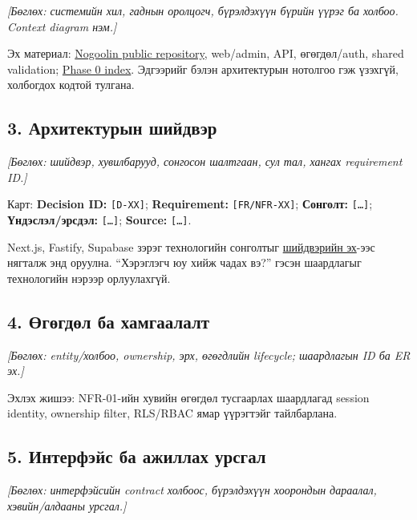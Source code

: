 \documentclass[
  11pt,
  a4paper,
]{article}
\begin{document}
\emph{{[}Бөглөх: системийн хил, гаднын оролцогч, бүрэлдэхүүн бүрийн
үүрэг ба холбоо. Context diagram нэм.{]}}

Эх материал: \href{https://github.com/Tengis01/Nogoolin}{Nogoolin public
repository}, web/admin, API, өгөгдөл/auth, shared validation;
\href{../../phase-0/README.md}{Phase 0 index}. Эдгээрийг бэлэн
архитектурын нотолгоо гэж үзэхгүй, холбогдох кодтой тулгана.

\subsection{3. Архитектурын
шийдвэр}\label{doc6-ux430ux440ux445ux438ux442ux435ux43aux442ux443ux440ux44bux43d-ux448ux438ux439ux434ux432ux44dux440}

\emph{{[}Бөглөх: шийдвэр, хувилбарууд, сонгосон шалтгаан, сул тал,
хангах requirement ID.{]}}

Карт: \textbf{Decision ID:} \nolinkurl{[D-XX]}; \textbf{Requirement:}
\nolinkurl{[FR/NFR-XX]}; \textbf{Сонголт:} \nolinkurl{[…]};
\textbf{Үндэслэл/эрсдэл:} \nolinkurl{[…]}; \textbf{Source:}
\nolinkurl{[…]}.

Next.js, Fastify, Supabase зэрэг технологийн сонголтыг
\href{../../../agent-context/DECISIONS.md}{шийдвэрийн эх}-ээс нягталж
энд оруулна. ``Хэрэглэгч юу хийж чадах вэ?'' гэсэн шаардлагыг
технологийн нэрээр орлуулахгүй.

\subsection{4. Өгөгдөл ба
хамгаалалт}\label{doc6-ux4e9ux433ux4e9ux433ux434ux4e9ux43b-ux431ux430-ux445ux430ux43cux433ux430ux430ux43bux430ux43bux442}

\emph{{[}Бөглөх: entity/холбоо, ownership, эрх, өгөгдлийн lifecycle;
шаардлагын ID ба ER эх.{]}}

Эхлэх жишээ: NFR-01-ийн хувийн өгөгдөл тусгаарлах шаардлагад session
identity, ownership filter, RLS/RBAC ямар үүрэгтэйг тайлбарлана.

\subsection{5. Интерфэйс ба ажиллах
урсгал}\label{doc6-ux438ux43dux442ux435ux440ux444ux44dux439ux441-ux431ux430-ux430ux436ux438ux43bux43bux430ux445-ux443ux440ux441ux433ux430ux43b}

\emph{{[}Бөглөх: интерфэйсийн contract холбоос, бүрэлдэхүүн хоорондын
дараалал, хэвийн/алдааны урсгал.{]}}
\end{document}
